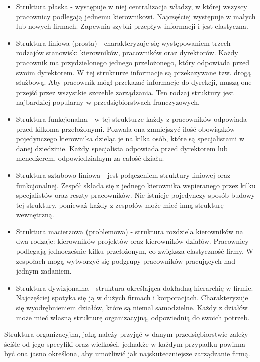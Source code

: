 \begin{itemize}
    \item Struktura płaska - występuje w niej centralizacja władzy, w której wszyscy pracownicy podlegają jednemu kierownikowi. Najczęściej występuje w małych lub nowych firmach. Zapewnia szybki przepływ informacji i jest elastyczna.

    \item Struktura liniowa (prosta) - charakteryzuje się występowaniem trzech rodzajów stanowisk: kierowników, pracowników oraz dyrektorów. Każdy pracownik ma przydzielonego jednego przełożonego, który odpowiada przed swoim dyrektorem. W tej strukturze informacje są przekazywane tzw. drogą służbową. Aby pracownik mógł przekazać informacje do dyrekcji, muszą one przejść przez wszystkie szczeble zarządzania. Ten rodzaj struktury jest najbardziej popularny w przedsiębiorstwach franczyzowych.

    \item Struktura funkcjonalna - w tej strukturze każdy z pracowników odpowiada przed kilkoma przełożonymi. Pozwala ona zmniejszyć ilość obowiązków pojedynczego kierownika dzieląc je na kilka osób, które są specjalistami w danej dziedzinie. Każdy specjalista odpowiada przed dyrektorem lub menedżerem, odpowiedzialnym za całość działu.

    \item Struktura sztabowo-liniowa - jest połączeniem struktury liniowej oraz funkcjonalnej. Zespół składa się z jednego kierownika wspieranego przez kilku specjalistów oraz reszty pracowników. Nie istnieje pojedynczy sposób budowy tej struktury, ponieważ każdy z zespołów może mieć inną strukturę wewnętrzną.

    \item Struktura macierzowa (problemowa) - struktura rozdziela kierowników na dwa rodzaje: kierowników projektów oraz kierowników działów. Pracownicy podlegają jednocześnie kilku przełożonym, co zwiększa elastyczność firmy. W zespołach mogą wytworzyć się podgrupy pracowników pracujących nad jednym zadaniem.

    \item Struktura dywizjonalna - struktura określająca dokładną hierarchię w firmie. Najczęściej spotyka się ją w dużych firmach i korporacjach. Charakteryzuje się wyodrębnieniem działów, które są niemal samodzielne. Każdy z działów może mieć własną strukturę organizacyjną, odpowiednią do swoich potrzeb.
\end{itemize}

Struktura organizacyjna, jaką należy przyjąć w danym przedsiębiorstwie zależy ściśle od jego specyfiki oraz wielkości, jednakże w każdym przypadku powinna być ona jasno określona, aby umożliwić jak najskuteczniejsze zarządzanie firmą.

